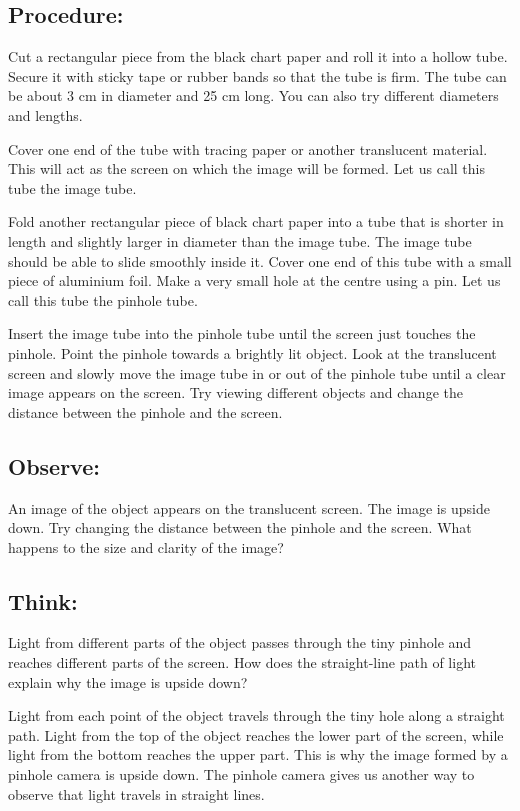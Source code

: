 \documentclass{xtufte-handout}
\begin{document}
\subsection{Procedure:} Cut a rectangular piece from the black chart paper and roll it into a hollow tube. Secure it with sticky tape or rubber bands so that the tube is firm. The tube can be about 3 cm in diameter and 25 cm long. You can also try different diameters and lengths.

Cover one end of the tube with tracing paper or another translucent material. This will act as the screen on which the image will be formed. Let us call this tube the image tube.

Fold another rectangular piece of black chart paper into a tube that is shorter in length and slightly larger in diameter than the image tube. The image tube should be able to slide smoothly inside it. Cover one end of this tube with a small piece of aluminium foil. Make a very small hole at the centre using a pin. Let us call this tube the pinhole tube.

Insert the image tube into the pinhole tube until the screen just touches the pinhole. Point the pinhole towards a brightly lit object. Look at the translucent screen and slowly move the image tube in or out of the pinhole tube until a clear image appears on the screen. Try viewing different objects and change the distance between the pinhole and the screen.

\subsection{Observe:} An image of the object appears on the translucent screen. The image is upside down. Try changing the distance between the pinhole and the screen. What happens to the size and clarity of the image?

\subsection{Think:} Light from different parts of the object passes through the tiny pinhole and reaches different parts of the screen. How does the straight-line path of light explain why the image is upside down?

Light from each point of the object travels through the tiny hole along a straight path. Light from the top of the object reaches the lower part of the screen, while light from the bottom reaches the upper part. This is why the image formed by a pinhole camera is upside down. The pinhole camera gives us another way to observe that light travels in straight lines.
\end{document}
